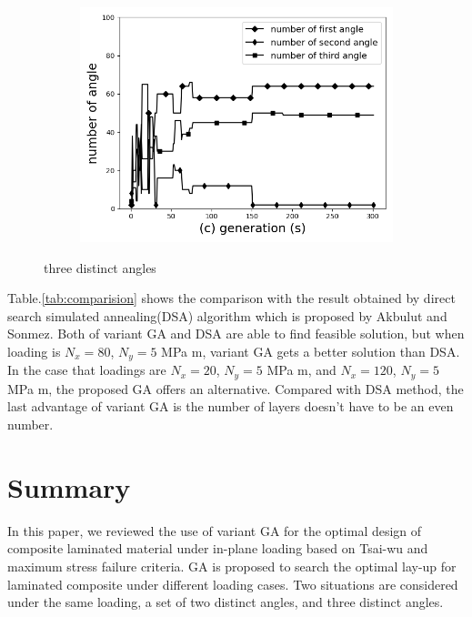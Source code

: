 {\begin{figure}[!htb]
		\begin{subfigure}[b]{0.8\linewidth}
			\includegraphics[width=\linewidth]{Figures/chapter4_second_three_distinct_angler_number_of_angle.png}
		\end{subfigure}
	\caption{three distinct angles}
	\label{fig:three_angles}
\end{figure}
\clearpage
}





Table.\ref{tab:comparision} shows the comparison with the result obtained by
direct search simulated annealing(DSA) algorithm which is proposed by Akbulut
and Sonmez\cite{akbulut2008optimum}.  Both of variant GA and DSA are able to
find feasible solution, but when loading is $N_x=80$, $N_y=5$ MPa m, variant GA
gets a better solution than DSA. In the case that loadings are $N_x=20$, $N_y=5$ MPa m,
and $N_x=120$, $N_y=5$ MPa m,  the proposed GA offers an alternative. Compared
with DSA method, the last advantage of variant GA is the number of layers
doesn't have to be an even number.

\section{Summary}
In this paper, we reviewed the use of variant GA for the optimal design of composite
laminated material under in-plane loading based on Tsai-wu and maximum stress
failure criteria. GA is proposed to search the optimal lay-up for laminated
composite under different loading cases. Two situations are considered under the same
loading, a set of two distinct angles, and three distinct angles. 

